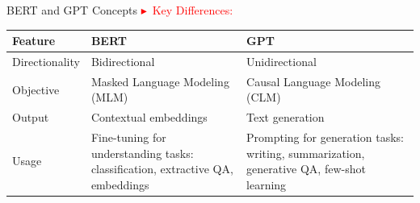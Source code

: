 \begin{frame}{BERT and GPT Concepts}
  \textcolor{red}{\large$\blacktriangleright$~Key Differences:}\\[1em]
  \renewcommand{\arraystretch}{1.3}
  \begin{tabular}{|l|p{3cm}|p{3cm}|}
    \hline
    \textbf{Feature}      & \textbf{BERT}                                    & \textbf{GPT}                       \\
    \hline
    Directionality        & Bidirectional                                    & Unidirectional                     \\
    \hline
    Objective             & Masked Language Modeling (MLM)                   & Causal Language Modeling (CLM)     \\
    \hline
    Output                & Contextual embeddings                            & Text generation                    \\
    \hline
    Usage                 & Fine-tuning for understanding tasks: classification, extractive QA, embeddings & Prompting for generation tasks: writing, summarization, generative QA, few-shot learning \\
    \hline
  \end{tabular}
\end{frame}
